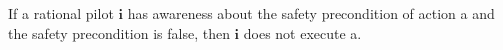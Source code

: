 %
%

%
%	    

\begin{theorem}
	\label{awareness}
	If a rational pilot $\mathbf{i}$ has awareness about the safety precondition of action a and the safety precondition is false, then $\mathbf{i}$ does not execute a.
\end{theorem}


